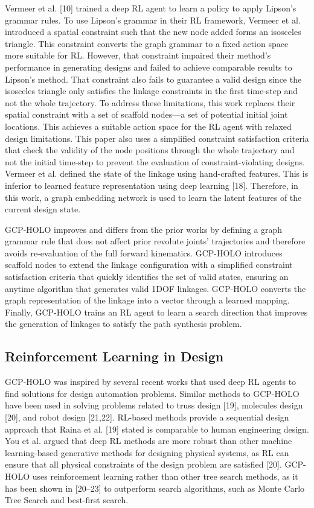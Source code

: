 Vermeer et al. [10] trained a deep RL agent to learn a policy to apply Lipson’s grammar rules. To use Lipson’s grammar in their RL framework, Vermeer et al. introduced a spatial constraint such that the new node added forms an isosceles triangle. This constraint converts the graph grammar to a fixed action space more suitable for RL. However, that constraint impaired their method’s performance in generating designs and failed to achieve comparable results to Lipson’s method. That constraint also fails to guarantee a valid design since the isosceles triangle only satisfies the linkage constraints in the first time-step and not the whole trajectory. To address these limitations, this work replaces their spatial constraint with a set of scaffold nodes—a set of potential initial joint locations. This achieves a suitable action space for the RL agent with relaxed design limitations. This paper also uses a simplified constraint satisfaction criteria that check the validity of the node positions through the whole trajectory and not the initial time-step to prevent the evaluation of constraint-violating designs. Vermeer et al. defined the state of the linkage using hand-crafted features. This is inferior to learned feature representation using deep learning [18]. Therefore, in this work, a graph embedding network is used to learn the latent features of the current design state.

GCP-HOLO improves and differs from the prior works by defining a graph grammar rule that does not affect prior revolute joints’ trajectories and therefore avoids re-evaluation of the full forward kinematics. GCP-HOLO introduces scaffold nodes to extend the linkage configuration with a simplified constraint satisfaction criteria that quickly identifies the set of valid states, ensuring an anytime algorithm that generates valid 1DOF linkages. GCP-HOLO converts the graph representation of the linkage into a vector through a learned mapping. Finally, GCP-HOLO trains an RL agent to learn a search direction that improves the generation of linkages to satisfy the path synthesis problem.

\subsection{Reinforcement Learning in Design}
GCP-HOLO was inspired by several recent works that used deep RL agents to find solutions for design automation problems. Similar methods to GCP-HOLO have been used in solving problems related to truss design [19], molecules design [20], and robot design [21,22]. RL-based methods provide a sequential design approach that Raina et al. [19] stated is comparable to human engineering design. You et al. argued that deep RL methods are more robust than other machine learning-based generative methods for designing physical systems, as RL can ensure that all physical constraints of the design problem are satisfied [20]. GCP-HOLO uses reinforcement learning rather than other tree search methods, as it has been shown in [20–23] to outperform search algorithms, such as Monte Carlo Tree Search and best-first search.

